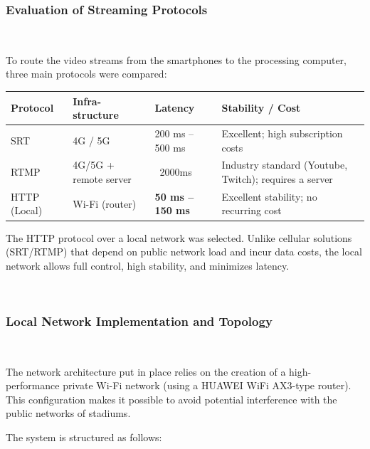 \documentclass[conference]{IEEEtran}
\begin{document}
\subsubsection{Evaluation of Streaming Protocols}\


To route the video streams from the smartphones to the processing computer, three main protocols were compared:
 

\vspace{0.5em}
\begin{center}
\renewcommand{\arraystretch}{1.2}
\begin{tabular}{|p{1.6cm}|p{1.2cm}|p{1.3cm}|p{2.6cm}|}
    \hline
    \textbf{Protocol} & \textbf{Infra-structure} & \textbf{Latency} & \textbf{Stability / Cost} \\
    \hline
    SRT & 4G / 5G & 200 ms – 500 ms & Excellent; high subscription costs \\
    \hline
    RTMP & 4G/5G + remote server & ~2000ms & Industry standard (Youtube, Twitch); requires a server \\
    \hline
    HTTP (Local) & Wi-Fi (router) & \textbf{50 ms – 150 ms} & Excellent stability; no recurring cost \\
    \hline
\end{tabular}
\end{center}
\vspace{0.5em}
 


The HTTP protocol over a local network was selected. Unlike cellular solutions
(SRT/RTMP) that depend on public network load and incur data costs, the local network
allows full control, high stability, and minimizes latency.
 
\
\subsubsection{Local Network Implementation and Topology}\
 
The network architecture put in place relies on the creation of a high-performance
private Wi-Fi network (using a HUAWEI WiFi AX3-type router). This configuration makes it
possible to avoid potential interference with the public networks of stadiums.
 
The system is structured as follows:
 
\end{document}
